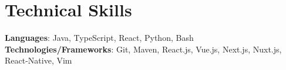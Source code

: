 \section{Technical Skills}
\begin{itemize}[leftmargin=0.15in, label={}]
	\small{\item{
	      \textbf{Languages}{: Java, TypeScript, React, Python, Bash } \\
	      \textbf{Technologies/Frameworks}{: Git, Maven, React.js, Vue.js, Next.js, Nuxt.js, React-Native, Vim}}} \\
\end{itemize}
